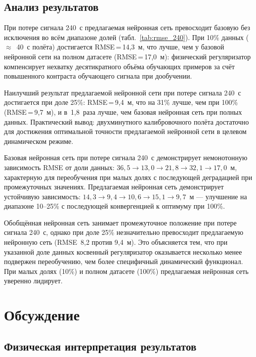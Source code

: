 \subsection{Анализ результатов}
\label{sec:analysis}

При потере сигнала 240~с предлагаемая нейронная сеть превосходит базовую без
исключения во всём диапазоне долей (табл.~\ref{tab:rmse_240}).
При 10\% данных ($\approx$~40~с полёта) достигается RMSE\,=\,14{,}3~м,
что лучше, чем у базовой нейронной сети на полном датасете (RMSE\,=\,17{,}0~м):
физический регуляризатор компенсирует нехватку десятикратного объёма обучающих
примеров за счёт повышенного контраста обучающего сигнала при дообучении.

Наилучший результат предлагаемой нейронной сети при потере сигнала 240~с
достигается при доле 25\%: RMSE\,=\,9{,}4~м, что на 31\% лучше, чем при 100\%
(RMSE\,=\,9{,}7~м), и в~1{,}8~раза лучше, чем базовая нейронная сеть при
полных данных.
Практический вывод: двухминутного калибровочного полёта достаточно для
достижения оптимальной точности предлагаемой нейронной сети в целевом
динамическом режиме.

Базовая нейронная сеть при потере сигнала 240~с демонстрирует немонотонную
зависимость RMSE от доли данных:
$36{,}5 \to 13{,}0 \to 21{,}8 \to 32{,}1 \to 17{,}0$~м, характерную для
переобучения при малых долях с последующей деградацией при промежуточных
значениях.
Предлагаемая нейронная сеть демонстрирует устойчивую зависимость:
$14{,}3 \to 9{,}4 \to 10{,}6 \to 15{,}1 \to 9{,}7$~м ---
улучшение на диапазоне 10--25\% с последующей конвергенцией к оптимуму
при 100\%.

Обобщённая нейронная сеть занимает промежуточное положение при потере сигнала
240~с, однако при доле 25\% незначительно превосходит предлагаемую нейронную
сеть (RMSE~8{,}2 против 9{,}4~м).
Это объясняется тем, что при указанной доле данных косвенный регуляризатор
оказывается несколько менее подвержен переобучению, чем более специфичный
динамический функционал.
При малых долях (10\%) и полном датасете (100\%) предлагаемая нейронная сеть
уверенно лидирует.

\section{Обсуждение}
\label{sec:discussion}

\subsection{Физическая интерпретация результатов}


